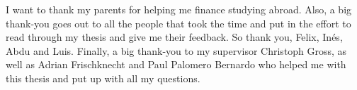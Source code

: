 I want to thank my parents for helping me finance studying abroad.
Also, a big thank-you goes out to all the people that took the time
and put in the effort to read through my thesis and give me their feedback.
So thank you, Felix, Inés, Abdu and Luis.
Finally, a big thank-you to my supervisor Christoph Gross, as well
as Adrian Frischknecht and Paul Palomero Bernardo who helped me
with this thesis and put up with all my questions.
